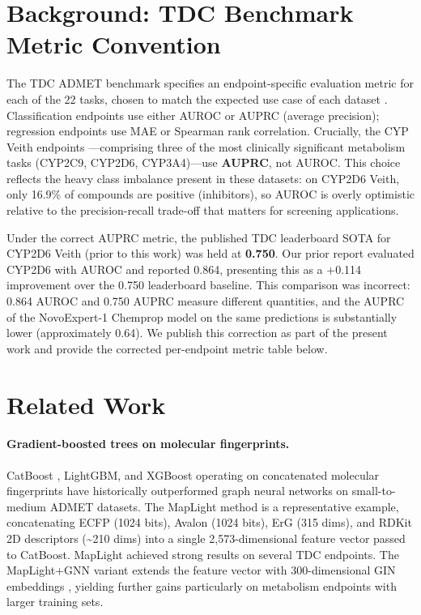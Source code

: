 \documentclass[11pt]{article}
\begin{document}
\section{Background: TDC Benchmark Metric Convention}

The TDC ADMET benchmark specifies an endpoint-specific evaluation metric for each of the 22 tasks, chosen to match the expected use case of each dataset \citep{huang2021therapeutics}. Classification endpoints use either AUROC or AUPRC (average precision); regression endpoints use MAE or Spearman rank correlation. Crucially, the CYP Veith endpoints \citep{veith2009cyp}---comprising three of the most clinically significant metabolism tasks (CYP2C9, CYP2D6, CYP3A4)---use \textbf{AUPRC}, not AUROC. This choice reflects the heavy class imbalance present in these datasets: on CYP2D6 Veith, only 16.9\% of compounds are positive (inhibitors), so AUROC is overly optimistic relative to the precision-recall trade-off that matters for screening applications.

Under the correct AUPRC metric, the published TDC leaderboard SOTA for CYP2D6 Veith (prior to this work) was held at \textbf{0.750}. Our prior report \citep{harrison2026novoexpert1} evaluated CYP2D6 with AUROC and reported 0.864, presenting this as a $+$0.114 improvement over the 0.750 leaderboard baseline. This comparison was incorrect: 0.864 AUROC and 0.750 AUPRC measure different quantities, and the AUPRC of the NovoExpert-1 Chemprop model on the same predictions is substantially lower (approximately 0.64). We publish this correction as part of the present work and provide the corrected per-endpoint metric table below.

\section{Related Work}

\paragraph{Gradient-boosted trees on molecular fingerprints.}
CatBoost \citep{prokhorenkova2018catboost}, LightGBM, and XGBoost operating on concatenated molecular fingerprints have historically outperformed graph neural networks on small-to-medium ADMET datasets. The MapLight method \citep{notwell2023maplight} is a representative example, concatenating ECFP (1024 bits), Avalon (1024 bits), ErG (315 dims), and RDKit 2D descriptors (\textasciitilde 210 dims) into a single 2{,}573-dimensional feature vector passed to CatBoost. MapLight achieved strong results on several TDC endpoints. The MapLight+GNN variant extends the feature vector with 300-dimensional GIN embeddings \citep{hu2020gin}, yielding further gains particularly on metabolism endpoints with larger training sets.
\end{document}
